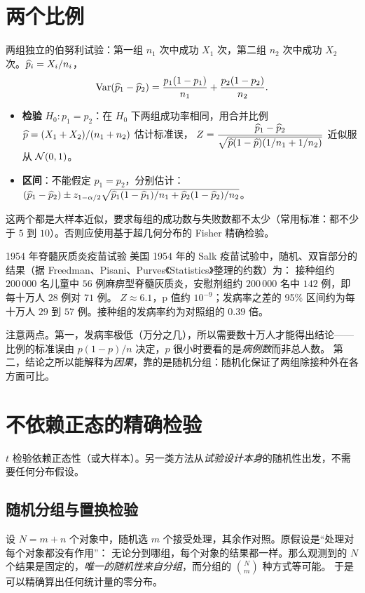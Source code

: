 \section{两个比例}
\label{sec:prop}

两组独立的伯努利试验：第一组 $n_1$ 次中成功 $X_1$ 次，第二组 $n_2$ 次中成功 $X_2$ 次。$\widehat{p}_i=X_i/n_i$，
\[
\operatorname{Var}(\widehat{p}_1-\widehat{p}_2)=\frac{p_1(1-p_1)}{n_1}+\frac{p_2(1-p_2)}{n_2}.
\]
\begin{itemize}
\item \textbf{检验} $H_0:p_1=p_2$：在 $H_0$ 下两组成功率相同，用合并比例 $\widehat{p}=(X_1+X_2)/(n_1+n_2)$ 估计标准误，
$Z=\dfrac{\widehat{p}_1-\widehat{p}_2}{\sqrt{\widehat{p}(1-\widehat{p})(1/n_1+1/n_2)}}$ 近似服从 $\mathcal{N}(0,1)$。
\item \textbf{区间}：不能假定 $p_1=p_2$，分别估计：$(\widehat{p}_1-\widehat{p}_2)\pm z_{1-\alpha/2}\sqrt{\widehat{p}_1(1-\widehat{p}_1)/n_1+\widehat{p}_2(1-\widehat{p}_2)/n_2}$。
\end{itemize}
这两个都是大样本近似，要求每组的成功数与失败数都不太少（常用标准：都不少于 $5$ 到 $10$）。否则应使用基于超几何分布的 Fisher 精确检验。

\begin{casestudy}{1954 年脊髓灰质炎疫苗试验}
美国 1954 年的 Salk 疫苗试验中，随机、双盲部分的结果（据 Freedman、Pisani、Purves《Statistics》整理的约数）为：
接种组约 $200\,000$ 名儿童中 $56$ 例麻痹型脊髓灰质炎，安慰剂组约 $200\,000$ 名中 $142$ 例，即每十万人 $28$ 例对 $71$ 例。
$Z\approx6.1$，p 值约 $10^{-9}$；发病率之差的 95\% 区间约为每十万人 $29$ 到 $57$ 例。接种组的发病率约为对照组的 $0.39$ 倍。

注意两点。第一，发病率极低（万分之几），所以需要数十万人才能得出结论——比例的标准误由 $p(1-p)/n$ 决定，$p$ 很小时要看的是\emph{病例数}而非总人数。
第二，结论之所以能解释为\emph{因果}，靠的是随机分组：随机化保证了两组除接种外在各方面可比。
\end{casestudy}

\section{不依赖正态的精确检验}
\label{sec:perm}

$t$ 检验依赖正态性（或大样本）。另一类方法从\emph{试验设计本身}的随机性出发，不需要任何分布假设。

\subsection{随机分组与置换检验}

设 $N=m+n$ 个对象中，随机选 $m$ 个接受处理，其余作对照。原假设是“处理对每个对象都没有作用”：
无论分到哪组，每个对象的结果都一样。那么观测到的 $N$ 个结果是固定的，\emph{唯一的随机性来自分组}，而分组的 $\binom Nm$ 种方式等可能。
于是可以精确算出任何统计量的零分布。

